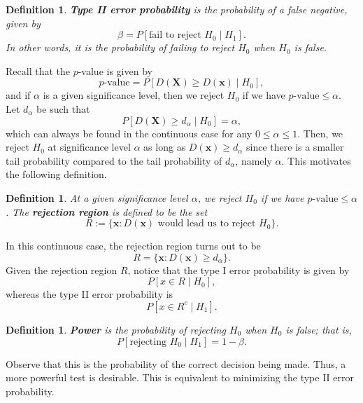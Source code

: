 \documentclass[10pt]{article}
\theoremstyle{newstyle}
\newtheorem{defn}[thm]{Definition}
\begin{document}
\begin{defn}
{\bf Type II error probability} is the probability of a false negative, given by 
\[ \beta = P[\text{fail to reject } H_0 \mid H_1]. \]
In other words, it is the probability of failing to reject $H_0$ when $H_0$ is false. 
\end{defn}

Recall that the $p$-value is given by 
\[ \text{$p$-value} = P[D(\mathbf X) \geq D(\mathbf x) \mid H_0], \]
and if $\alpha$ is a given significance level, then we reject $H_0$ if we have $\text{$p$-value} 
\leq \alpha$. Let $d_\alpha$ be such that 
\[ P[D(\mathbf X) \geq d_\alpha \mid H_0] = \alpha, \]
which can always be found in the continuous case for any $0 \leq \alpha \leq 1$. 
Then, we reject $H_0$ at significance level $\alpha$ as long as $D(\mathbf x) \geq d_\alpha$ 
since there is a smaller tail probability compared to the tail probability of $d_\alpha$, 
namely $\alpha$. This motivates the following definition. 

\begin{defn}
At a given significance level $\alpha$, we reject $H_0$ if we have $\text{$p$-value} \leq \alpha$. 
The {\bf rejection region} is defined to be the set 
\[ R := \{\mathbf x : D(\mathbf x) \text{ would lead us to reject } H_0\}. \]
\end{defn}

In this continuous case, the rejection region turns out to be 
\[ R = \{\mathbf x : D(\mathbf x) \geq d_\alpha\}. \] 
Given the rejection region $R$, notice that the type I error probability is given by 
\[ P[x \in R \mid H_0], \]
whereas the type II error probability is 
\[ P[x \in R^c \mid H_1]. \]

\begin{defn}
{\bf Power} is the probability of rejecting $H_0$ when $H_0$ is false; that is, 
\[ P[\text{rejecting } H_0 \mid H_1] = 1-\beta. \]
\end{defn}

Observe that this is the probability of the correct decision being made. Thus, a more 
powerful test is desirable. This is equivalent to minimizing the type II error probability. 
\end{document}
